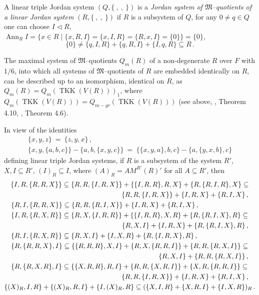 \documentclass[a4paper,11pt]{article}
\DeclareMathOperator{\Ann}{Ann}
\DeclareMathOperator{\TKK}{TKK}
\begin{document}
A linear triple Jordan system ${(Q, \{\ ,\ ,\ \})}$ is a \emph{Jordan system 
of $\mathfrak{M}$--quotients of a linear Jordan system} ${(R, \{\ ,\ ,\ \})}$ 
if $R$ is a subsystem of $Q$, 
for any ${0\ne q\in Q}$ one can choose ${I\lhd R}$, 
${\Ann_R I=\{x\in R\mid \{x, R, I\}=\{x, I, R\}=\{R, x, I\}=\{0\}\}=\{0\}}$, 
\[
\{0\}\ne \{q, I, R\}+\{q, R, I\}+\{I, q, R\}\subseteq R\,.
\]

The maximal system of $\mathfrak{M}$--quotients $Q_m(R)$ of a non-degenerate 
$R$ over $F$ with $1/6$, into which all systems of $\mathfrak{M}$--quotients 
of $R$ are embedded identically on $R$, can be described up to an isomorphism,  
identical on $R$, as ${Q_m(R)=Q_m(\TKK(V(R)))_1}$, where  
$Q_m(\TKK(V(R)))=Q_{m-gr}(\TKK(V(R)))$ (see above, \cite{OMol}, Theorem 4.10, 
\cite{JMQ}, Theorem 4.6). 

In view of the identities 
\begin{gather*}
\{x, y, z\}\ =\ \{z, y, x\}\,,
\\
\{x, y, \{a, b, c\}\}-\{a, b, \{x, y, c\}\}\ =\ 
\{\{x, y, a\}, b, c\}-\{a, \{y, x, b\}, c\} 
\end{gather*}
defining linear triple Jordan systems, if $R$ is a subsystem of the 
system $R'$, ${X, I\subseteq R'}$, ${(I)_R\subseteq I}$, where 
${(A)_R=A M^{R'}(R)'}$ for all ${A\subseteq R'}$, then 
\begin{multline*}
\{I, R, \{R, R, X\}\}\subseteq \{R, R, \{I, R, X\}\}+
\{\{I, R, R\}, R, X\}+\{R, \{R, I, R\}, X\}\subseteq
\\ 
\shoveright{
\{R, R, \{I, R, X\}\}+\{I, R, X\}+\{R, I, X\}\,,}
\\
\shoveleft{
\{R, I, \{R, R, X\}\}\subseteq \{R, R, \{R, I, X\}\}+
\{I, R, X\}+\{R, I, X\}\,,}
\\
\shoveleft{
\{I, R, \{R, X, R\}\}\subseteq \{R, X, \{I, R, R\}\}+
\{\{I, R, R\}, X, R\}+\{R, \{R, I, X\}, R\}\subseteq}
\\
\shoveright{
\{R, X, I\}+\{I, R, X\}+\{R, \{R, I, X\}, R\}\,,}
\\
\shoveleft{
\{R, I, \{R, X, R\}\}\subseteq \{R, X, I\}+\{I, X, R\}+
\{R, \{I, R, X\}, R\}\,,}
\\
\shoveleft{
\{R, \{R, R, X\}, I\}\subseteq \{\{R, R, R\}, X, I\}+
\{R, X, \{R, R, I\}\}+\{R, R, \{R, X, I\}\}\subseteq}
\\
\shoveright{
\{R, X, I\}+\{R, R, \{R, X, I\}\}\,,}
\\
\shoveleft{
\{R, \{R, X, R\}, I\}\subseteq \{\{X, R, R\}, R, I\}+
\{R, R, \{X, R, I\}\}+\{X, R, \{R, R, I\}\}\subseteq}
\\
\shoveright{
\{R, R, \{I, R, X\}\}+\{I, R, X\}+\{R, I, X\}\,,}
\\
\{(X)_R, I, R\}+\{(X)_R, R, I\}+\{I, (X)_R, R\}\subseteq  
(\{X, I, R\}+\{X, R, I\}+\{I, X, R\})_R\,.
\end{multline*}
\end{document}
